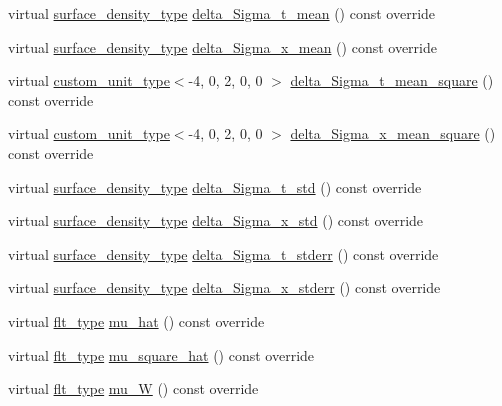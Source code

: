 \begin{DoxyCompactItemize}
virtual \hyperlink{namespaceIceBRG_a80c597ef5ba0a32491d32a9f0083b02d}{surface\+\_\+density\+\_\+type} \hyperlink{classIceBRG_1_1pair__bin_a135ada0d34fa0b01e1e9b80b0cd833da}{delta\+\_\+\+Sigma\+\_\+t\+\_\+mean} () const  override
\item 
virtual \hyperlink{namespaceIceBRG_a80c597ef5ba0a32491d32a9f0083b02d}{surface\+\_\+density\+\_\+type} \hyperlink{classIceBRG_1_1pair__bin_afe288e336ac95efb914a57f9a97d8f3a}{delta\+\_\+\+Sigma\+\_\+x\+\_\+mean} () const  override
\item 
virtual \hyperlink{namespaceIceBRG_a896bc1bf7e8db5ca045b9cf35912ca5e}{custom\+\_\+unit\+\_\+type}$<$-\/4, 0, 2, 0, 0 $>$ \hyperlink{classIceBRG_1_1pair__bin_aaf35ab19f4b3ff860520955abf89b5f5}{delta\+\_\+\+Sigma\+\_\+t\+\_\+mean\+\_\+square} () const  override
\item 
virtual \hyperlink{namespaceIceBRG_a896bc1bf7e8db5ca045b9cf35912ca5e}{custom\+\_\+unit\+\_\+type}$<$-\/4, 0, 2, 0, 0 $>$ \hyperlink{classIceBRG_1_1pair__bin_a68e33a6c614371923299270b4cf277f1}{delta\+\_\+\+Sigma\+\_\+x\+\_\+mean\+\_\+square} () const  override
\item 
virtual \hyperlink{namespaceIceBRG_a80c597ef5ba0a32491d32a9f0083b02d}{surface\+\_\+density\+\_\+type} \hyperlink{classIceBRG_1_1pair__bin_a3906e226598ab31659de18bc1cd26224}{delta\+\_\+\+Sigma\+\_\+t\+\_\+std} () const  override
\item 
virtual \hyperlink{namespaceIceBRG_a80c597ef5ba0a32491d32a9f0083b02d}{surface\+\_\+density\+\_\+type} \hyperlink{classIceBRG_1_1pair__bin_a1b16cd7d7cd9d15f330c1a1c67a8c012}{delta\+\_\+\+Sigma\+\_\+x\+\_\+std} () const  override
\item 
virtual \hyperlink{namespaceIceBRG_a80c597ef5ba0a32491d32a9f0083b02d}{surface\+\_\+density\+\_\+type} \hyperlink{classIceBRG_1_1pair__bin_aee96bc08ec62350ac572c731419febdb}{delta\+\_\+\+Sigma\+\_\+t\+\_\+stderr} () const  override
\item 
virtual \hyperlink{namespaceIceBRG_a80c597ef5ba0a32491d32a9f0083b02d}{surface\+\_\+density\+\_\+type} \hyperlink{classIceBRG_1_1pair__bin_ae4447d7891d1594fdf9c6b77e1b742b3}{delta\+\_\+\+Sigma\+\_\+x\+\_\+stderr} () const  override
\item 
virtual \hyperlink{lib_2IceBRG__main_2common_8h_ad0f130a56eeb944d9ef2692ee881ecc4}{flt\+\_\+type} \hyperlink{classIceBRG_1_1pair__bin_a0793cbcd496d82135c5bd999a478aaea}{mu\+\_\+hat} () const  override
\item 
virtual \hyperlink{lib_2IceBRG__main_2common_8h_ad0f130a56eeb944d9ef2692ee881ecc4}{flt\+\_\+type} \hyperlink{classIceBRG_1_1pair__bin_aa5e53a1960df3f371193e3a9fb23f287}{mu\+\_\+square\+\_\+hat} () const  override
\item 
virtual \hyperlink{lib_2IceBRG__main_2common_8h_ad0f130a56eeb944d9ef2692ee881ecc4}{flt\+\_\+type} \hyperlink{classIceBRG_1_1pair__bin_a2105a4cd3310660b973cda251605015d}{mu\+\_\+\+W} () const  override
\end{DoxyCompactItemize}

